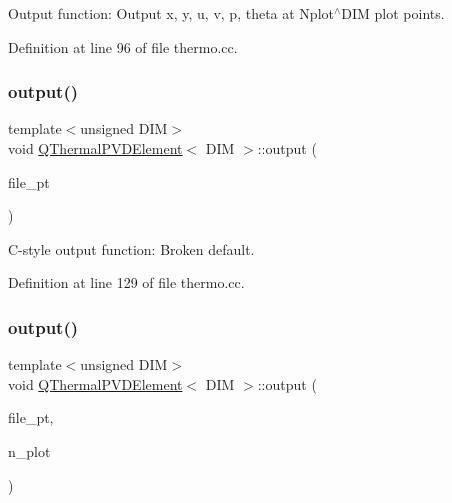 Output function\+: Output x, y, u, v, p, theta at Nplot$^\wedge$\+D\+IM plot points. 



Definition at line 96 of file thermo.\+cc.

\mbox{\label{classQThermalPVDElement_af290922dfcefef30dc03fca2a2cb4fbf}} 
\subsubsection{\texorpdfstring{output()}{output()}\hspace{0.1cm}{\footnotesize\ttfamily [3/4]}}
{\footnotesize\ttfamily template$<$unsigned D\+IM$>$ \\
void \hyperlink{classQThermalPVDElement}{Q\+Thermal\+P\+V\+D\+Element}$<$ D\+IM $>$\+::output (\begin{DoxyParamCaption}\item[{F\+I\+LE $\ast$}]{file\+\_\+pt }\end{DoxyParamCaption})\hspace{0.3cm}{\ttfamily [inline]}}



C-\/style output function\+: Broken default. 



Definition at line 129 of file thermo.\+cc.

\mbox{\label{classQThermalPVDElement_a649062cd4f15d8f14a2755786dd466dc}} 
\subsubsection{\texorpdfstring{output()}{output()}\hspace{0.1cm}{\footnotesize\ttfamily [4/4]}}
{\footnotesize\ttfamily template$<$unsigned D\+IM$>$ \\
void \hyperlink{classQThermalPVDElement}{Q\+Thermal\+P\+V\+D\+Element}$<$ D\+IM $>$\+::output (\begin{DoxyParamCaption}\item[{F\+I\+LE $\ast$}]{file\+\_\+pt,  }\item[{const unsigned \&}]{n\+\_\+plot }\end{DoxyParamCaption})\hspace{0.3cm}{\ttfamily [inline]}}



